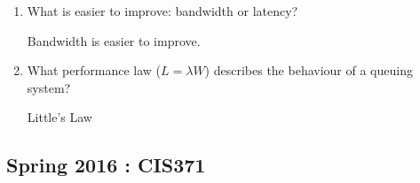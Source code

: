 \documentclass[12pt]{article}
\newenvironment{QandA}{\begin{enumerate}[label=\bfseries\alph*.]\bfseries}
                      {\end{enumerate}}
\newenvironment{answered}{\par\quad\normalfont}{}
\begin{document}
\begin{QandA}
   \item What is easier to improve: bandwidth or latency?
        \begin{answered}
        Bandwidth is easier to improve.
        \end{answered}
    \item What performance law ($L=\lambda W$) describes the behaviour of a queuing system?
        \begin{answered}
        Little's Law
        \end{answered}
\end{QandA}

\subsection{Spring 2016 : CIS371}
\end{document}
